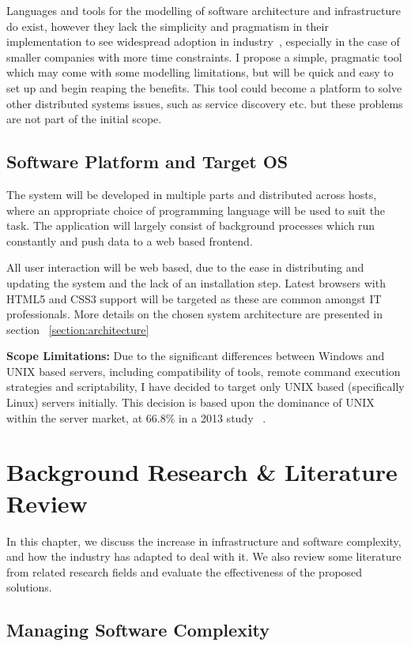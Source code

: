 \documentclass{cshonours}
\begin{document}
Languages and tools for the modelling of software architecture and infrastructure do exist, however they lack the simplicity and pragmatism in their implementation to see widespread adoption in industry~\cite{ModellingAdoption}, especially in the case of smaller companies with more time constraints. I propose a simple, pragmatic tool which may come with some modelling limitations, but will be quick and easy to set up and begin reaping the benefits. This tool could become a platform to solve other distributed systems issues, such as service discovery etc. but these problems are not part of the initial scope.

\section{Software Platform and Target OS}

The system will be developed in multiple parts and distributed across hosts, where an appropriate choice of programming language will be used to suit the task. The application will largely consist of background processes which run constantly and push data to a web based frontend.

All user interaction will be web based, due to the ease in distributing and updating the system and the lack of an installation step. Latest browsers with HTML5 and CSS3 support will be targeted as these are common amongst IT professionals. More details on the chosen system architecture are presented in section ~\ref{section:architecture}

\textbf{Scope Limitations:} Due to the significant differences between Windows and UNIX based servers, including compatibility of tools, remote command execution strategies and scriptability, I have decided to target only UNIX based (specifically Linux) servers initially. This decision is based upon the dominance of UNIX within the server market, at 66.8\% in a 2013 study ~\cite{UnixMarketShare}.

\chapter{Background Research \& Literature Review}

In this chapter, we discuss the increase in infrastructure and software complexity, and how the industry has adapted to deal with it. We also review some literature from related research fields and evaluate the effectiveness of the proposed solutions. 

\section{Managing Software Complexity}
\end{document}
